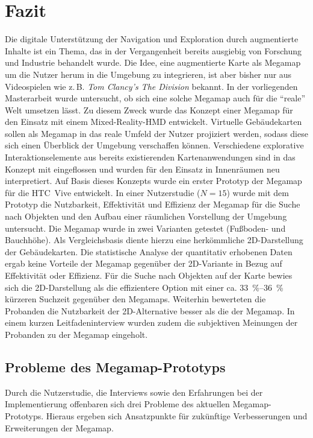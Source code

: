 \chapter{Fazit}
\label{chap:closing}
Die digitale Unterstützung der Navigation und Exploration durch augmentierte Inhalte ist ein Thema, das in der Vergangenheit bereits ausgiebig von Forschung und Industrie behandelt wurde.
Die Idee, eine augmentierte Karte als Megamap um die Nutzer herum in die Umgebung zu integrieren, ist aber bisher nur aus Videospielen wie z.\,B. \emph{Tom Clancy's The Division} bekannt.
In der vorliegenden Masterarbeit wurde untersucht, ob sich eine solche Megamap auch für die \enquote{reale} Welt umsetzen lässt.
Zu diesem Zweck wurde das Konzept einer Megamap für den Einsatz mit einem Mixed-Reality-HMD entwickelt.
Virtuelle Gebäudekarten sollen als Megamap in das reale Umfeld der Nutzer projiziert werden, sodass diese sich einen Überblick der Umgebung verschaffen können.
Verschiedene explorative Interaktionselemente aus bereits existierenden Kartenanwendungen sind in das Konzept mit eingeflossen und wurden für den Einsatz in Innenräumen neu interpretiert.
Auf Basis dieses Konzepts wurde ein erster Prototyp der Megamap für die HTC~Vive entwickelt.
In einer Nutzerstudie ($N=15$) wurde mit dem Prototyp die Nutzbarkeit, Effektivität und Effizienz der Megamap für die Suche nach Objekten und den Aufbau einer räumlichen Vorstellung der Umgebung untersucht.
Die Megamap wurde in zwei Varianten getestet (Fußboden- und Bauchhöhe).
Als Vergleichsbasis diente hierzu eine herkömmliche 2D-Darstellung der Gebäudekarten.
Die statistische Analyse der quantitativ erhobenen Daten ergab keine Vorteile der Megamap gegenüber der 2D-Variante in Bezug auf Effektivität oder Effizienz.
Für die Suche nach Objekten auf der Karte bewies sich die 2D-Darstellung als die effizientere Option mit einer ca. \SIrange{33}{36}{\percent} kürzeren Suchzeit gegenüber den Megamaps.
Weiterhin bewerteten die Probanden die Nutzbarkeit der 2D-Alternative besser als die der Megamap.
In einem kurzen Leitfadeninterview wurden zudem die subjektiven Meinungen der Probanden zu der Megamap eingeholt.

\section{Probleme des Megamap-Prototyps}
Durch die Nutzerstudie, die Interviews sowie den Erfahrungen bei der Implementierung offenbaren sich drei Probleme des aktuellen Megamap-Prototyps.
Hieraus ergeben sich Ansatzpunkte für zukünftige Verbesserungen und Erweiterungen der Megamap.

